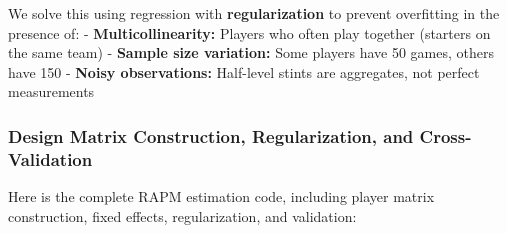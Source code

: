\documentclass[
  letterpaper,
  DIV=11,
  numbers=noendperiod]{scrartcl}
\begin{document}
We solve this using regression with \textbf{regularization} to prevent
overfitting in the presence of: - \textbf{Multicollinearity:} Players
who often play together (starters on the same team) - \textbf{Sample
size variation:} Some players have 50 games, others have 150 -
\textbf{Noisy observations:} Half-level stints are aggregates, not
perfect measurements

\subsubsection{Design Matrix Construction, Regularization, and
Cross-Validation}\label{design-matrix-construction-regularization-and-cross-validation}

Here is the complete RAPM estimation code, including player matrix
construction, fixed effects, regularization, and validation:
\end{document}
